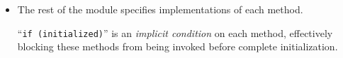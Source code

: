 \begin{frame}[fragile]
\begin{center}
\begin{minipage}{0.8\textwidth}
\begin{itemize}
     \vspace*{1ex}

     {\tt truncate()} converts the 6-bit {\tt rg\_init\_index} value
     to 5 bits needed for indexes into the register file.  {\BSV} has
     very strict type-checking; there are no silent truncations and
     extensions; without this {\tt truncate()} we'd get a type error.
     
   \item The rest of the module specifies implementations of each method.

     \vspace*{1ex}

     ``{\tt if (initialized)}'' is an \emph{implicit condition} on
     each method, effectively blocking these methods from being
     invoked before complete initialization.

  \end{itemize}

 \end{minipage}
\end{center}

\end{frame}


